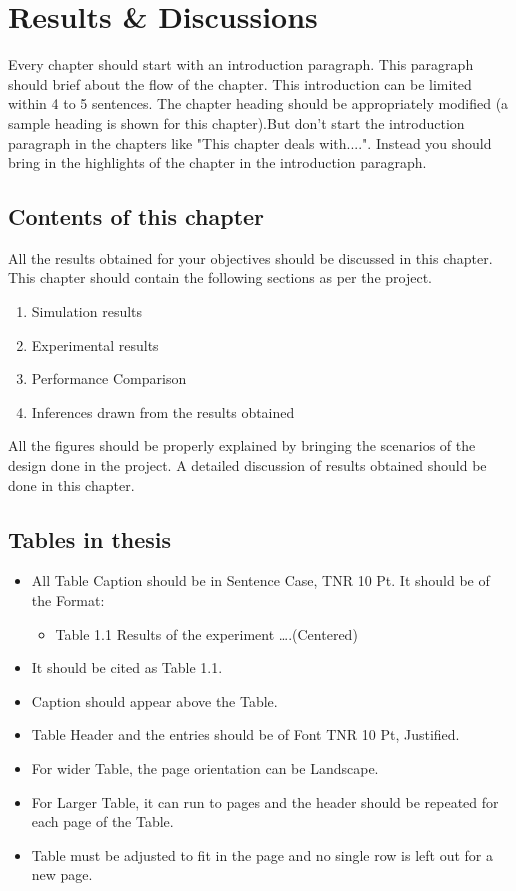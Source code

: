 \chapter{Results \& Discussions}
Every chapter should start with an introduction paragraph. This paragraph should brief about the flow of the chapter. This introduction can be limited within 4 to 5 sentences. The chapter heading should be appropriately modified (a sample heading is shown for this chapter).But don't start the introduction paragraph in the chapters like "This chapter deals with....". Instead you should bring in the highlights of the chapter in the introduction paragraph.
\section{Contents of this chapter}
All the results obtained for your objectives should be discussed in this chapter. This chapter should contain the following sections as per the project.
\begin{enumerate}
\item Simulation results
\item Experimental results
\item Performance Comparison
\item Inferences drawn from the results obtained
\end{enumerate}
All the figures should be properly explained by bringing the scenarios of the design done in the project. A detailed discussion of results obtained should be done in this chapter.

\section{Tables in thesis}
\begin{itemize}
	\item All Table Caption should be in Sentence Case, TNR 10 Pt. It should be of the Format:
	\begin{itemize}
		\item Table 1.1 Results of the experiment ….(Centered)
	\end{itemize}
	\item It should be cited as Table 1.1.
	\item Caption should appear above the Table.
	\item Table Header and the entries should be of Font TNR 10 Pt, Justified.
	\item For wider Table, the page orientation can be Landscape.
	\item For Larger Table, it can run to pages and the header should be repeated for each page of the Table.
	\item Table must be adjusted to fit in the page and no single row is left out for a new page.	
\end{itemize}

